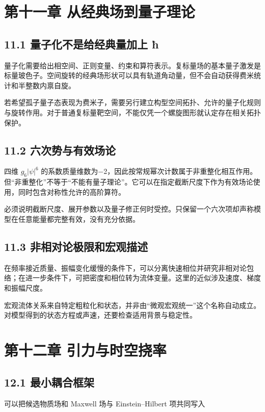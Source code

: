 \documentclass[UTF8,fontset=fandol,11pt]{ctexart}
\begin{document}
\section*{第十一章 从经典场到量子理论}

\subsection*{11.1 量子化不是给经典量加上 ħ}

量子化需要给出相空间、正则变量、约束和算符表示。复标量场的基本量子激发是标量玻色子。空间旋转的经典场形状可以具有轨道角动量，但不会自动获得费米统计和半整数内禀自旋。

若希望孤子量子态表现为费米子，需要另行建立构型空间拓扑、允许的量子化规则与旋转作用。对于普通复标量靶空间，不能仅凭一个螺旋图形就认定存在相关拓扑保护。

\subsection*{11.2 六次势与有效场论}

四维 \(g_6|\psi|^6\) 的系数质量维数为−2，因此按常规幂次计数属于非重整化相互作用。但“非重整化”不等于“不能有量子理论”。它可以在指定截断尺度下作为有效场论使用，同时包含对称性允许的高阶算符。

必须说明截断尺度、展开参数以及量子修正何时受控。只保留一个六次项却声称模型在任意能量都完整有效，没有充分依据。

\subsection*{11.3 非相对论极限和宏观描述}

在频率接近质量、振幅变化缓慢的条件下，可以分离快速相位并研究非相对论包络；在进一步条件下，可把密度和相位转为流体变量。这里的近似涉及速度、梯度和振幅尺度。

宏观流体关系来自特定粗粒化和状态，并非由“微观宏观统一”这个名称自动成立。对模型得到的状态方程或声速，还要检查适用背景与稳定性。

\section*{第十二章 引力与时空挠率}

\subsection*{12.1 最小耦合框架}

可以把候选物质场和 Maxwell 场与 Einstein–Hilbert 项共同写入
\end{document}

